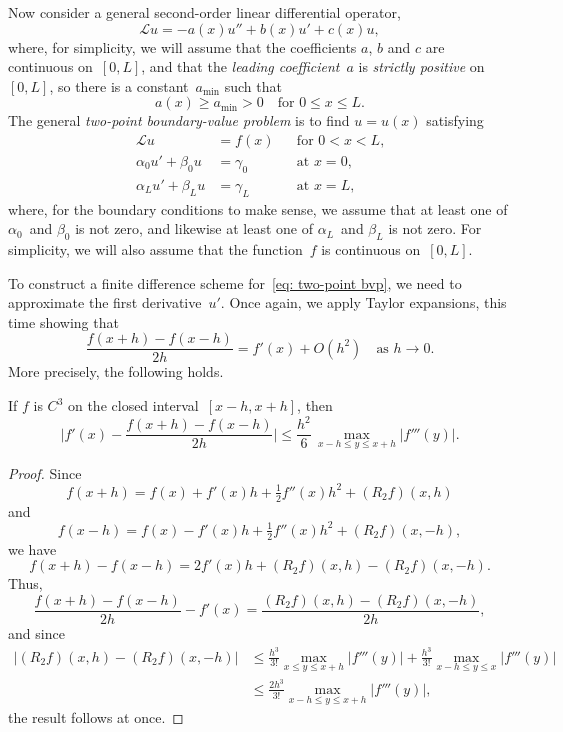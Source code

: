Now consider a general second-order linear differential operator,
\[
\mathcal{L}u=-a(x)u''+b(x)u'+c(x)u,
\]
where, for simplicity, we will assume that the coefficients $a$, $b$ and 
$c$ are continuous on~$[0,L]$, and that the \emph{leading coefficient}~$a$ is 
\emph{strictly positive} on~$[0,L]$, so there is a constant~$a_{\min}$ such that
\begin{equation}\label{eq: ellipticity 1d}
a(x)\ge a_{\min}>0\quad\text{for $0\le x\le L$.}
\end{equation}
The general \emph{two-point boundary-value problem} is to find $u=u(x)$ 
satisfying
\begin{equation}\label{eq: two-point bvp}
\begin{aligned}
\mathcal{L}u&=f(x)&&\text{for $0<x<L$,}\\
\alpha_0u'+\beta_0u&=\gamma_0&&\text{at $x=0$,}\\
\alpha_Lu'+\beta_Lu&=\gamma_L&&\text{at $x=L$,}
\end{aligned}
\end{equation}
where, for the boundary conditions to make sense, we assume that at least one 
of $\alpha_0$~and $\beta_0$ is not zero, and likewise at least one of  
$\alpha_L$~and $\beta_L$ is not zero.  For simplicity, we will also assume that 
the function~$f$ is continuous on~$[0,L]$.

To construct a finite difference scheme for~\eqref{eq: two-point bvp}, we need 
to approximate the first derivative~$u'$.  Once again, we apply Taylor 
expansions, this time showing that
\[
\frac{f(x+h)-f(x-h)}{2h}=f'(x)+O(h^2)\quad\text{as $h\to0$.}
\]
More precisely, the following holds.

\begin{theorem}\label{thm: first central diff}
If $f$ is $C^3$ on the closed interval~$[x-h,x+h]$, then
\[
\biggl|f'(x)-\frac{f(x+h)-f(x-h)}{2h}\biggr|
	\le\frac{h^2}{6}\,\max_{x-h\le y\le x+h}|f'''(y)|.
\]
\end{theorem}
\begin{proof}
Since
\[
f(x+h)=f(x)+f'(x)h+\tfrac12f''(x)h^2+(R_2f)(x,h)
\]
and
\[
f(x-h)=f(x)-f'(x)h+\tfrac12f''(x)h^2+(R_2f)(x,-h),
\]
we have
\[
f(x+h)-f(x-h)=2f'(x)h+(R_2f)(x,h)-(R_2f)(x,-h).
\]
Thus,
\[
\frac{f(x+h)-f(x-h)}{2h}-f'(x)=\frac{(R_2f)(x,h)-(R_2f)(x,-h)}{2h},
\]
and since
\begin{align*}
\bigl|(R_2f)(x,h)-(R_2f)(x,-h)\bigr|
	&\le\frac{h^3}{3!}\max_{x\le y\le x+h}|f'''(y)|
 	   +\frac{h^3}{3!}\max_{x-h\le y\le x}|f'''(y)|\\
	&\le\frac{2h^3}{3!}\max_{x-h\le y\le x+h}|f'''(y)|,
\end{align*}
the result follows at once.
\end{proof}

